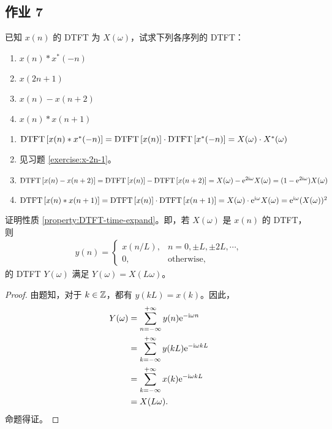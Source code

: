 \subsection{作业 7}

\begin{homework}
    已知 $x(n)$ 的 DTFT 为 $X(\omega)$，试求下列各序列的 DTFT：
    \begin{enumerate}[label=(\arabic*)]
        \item $x(n) * x^*(-n)$
        \item $x(2n + 1)$
        \item $x(n) - x(n + 2)$
        \item $x(n) * x(n + 1)$
    \end{enumerate}
\end{homework}

\begin{solution}
    \begin{enumerate}[label=(\arabic*)]
        \item $\mathrm{DTFT}\left[x(n) * x^*(-n)\right] = \mathrm{DTFT}\left[x(n)\right] \cdot \mathrm{DTFT}\left[x^*(-n)\right]
            = X(\omega) \cdot X^*(\omega)$
        \item 见习题 \ref{exercise:x-2n-1}。
        \item $\mathrm{DTFT}\left[x(n) - x(n + 2)\right] = \mathrm{DTFT}\left[x(n)\right] - \mathrm{DTFT}\left[x(n + 2)\right]
            = X(\omega) - \mathrm{e}^{2\mathrm{i}\omega}X(\omega)
            = (1 - \mathrm{e}^{2\mathrm{i}\omega})X(\omega)$
        \item $\mathrm{DTFT}\left[x(n) * x(n + 1)\right] = \mathrm{DTFT}\left[x(n)\right] \cdot \mathrm{DTFT}\left[x(n + 1)\right]
            = X(\omega) \cdot \mathrm{e}^{\mathrm{i}\omega}X(\omega)
            = \mathrm{e}^{\mathrm{i}\omega}(X(\omega))^2$
    \end{enumerate}
\end{solution}

\begin{homework}
    证明性质 \ref{property:DTFT-time-expand}。即，若 $X(\omega)$ 是 $x(n)$ 的 DTFT，则
    \begin{align*}
        y(n) = \begin{cases}
            x(n / L), & n = 0, \pm L, \pm 2L, \cdots, \\
            0, & \text{otherwise},
        \end{cases}
    \end{align*}
    的 DTFT $Y(\omega)$ 满足 $Y(\omega) = X(L \omega)$。
\end{homework}

\begin{proof}
    由题知，对于 $k \in \mathbb{Z}$，都有 $y(kL) = x(k)$。因此，
    \begin{align*}
        Y(\omega) & = \sum_{n = -\infty}^{+\infty}y(n)\mathrm{e}^{-\mathrm{i}\omega n} \\
        & = \sum_{k = -\infty}^{+\infty}y(k L)\mathrm{e}^{-\mathrm{i}\omega kL} \\
        & = \sum_{k = -\infty}^{+\infty}x(k)\mathrm{e}^{-\mathrm{i}\omega kL} \\
        & = X(L\omega).
    \end{align*}
    命题得证。
\end{proof}


